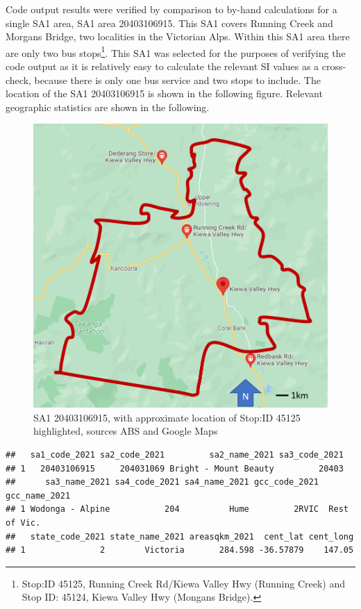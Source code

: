 \documentclass[]{tufte-book}
\begin{document}
Code output results were verified by comparison to by-hand calculations
for a single SA1 area, SA1 area 20403106915. This SA1 covers Running
Creek and Morgans Bridge, two localities in the Victorian Alps. Within
this SA1 area there are only two bus stops\footnote{Stop:ID 45125,
  Running Creek Rd/Kiewa Valley Hwy (Running Creek) and Stop ID: 45124,
  Kiewa Valley Hwy (Mongans Bridge).}. This SA1 was selected for the
purposes of verifying the code output as it is relatively easy to
calculate the relevant SI values as a cross-check, because there is only
one bus service and two stops to include. The location of the SA1
20403106915 is shown in the following figure. Relevant geographic
statistics are shown in the following.

\begin{figure}
\centering
\includegraphics{images/Running_creek_bus_stop.png}
\caption{SA1 20403106915, with approximate location of Stop:ID 45125
highlighted, sources ABS and Google Maps}
\end{figure}

\begin{verbatim}
##   sa1_code_2021 sa2_code_2021         sa2_name_2021 sa3_code_2021
## 1   20403106915     204031069 Bright - Mount Beauty         20403
##      sa3_name_2021 sa4_code_2021 sa4_name_2021 gcc_code_2021 gcc_name_2021
## 1 Wodonga - Alpine           204          Hume         2RVIC  Rest of Vic.
##   state_code_2021 state_name_2021 areasqkm_2021  cent_lat cent_long
## 1               2        Victoria       284.598 -36.57879    147.05
\end{verbatim}
\end{document}
